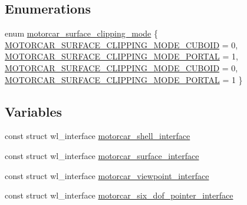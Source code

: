 \subsection*{Enumerations}
\begin{DoxyCompactItemize}
\item 
enum \hyperlink{motorcar-client-protocol_8h_a4609d9d55b9d8b4d07c8dd85fa4ec19d}{motorcar\-\_\-surface\-\_\-clipping\-\_\-mode} \{ \hyperlink{motorcar-client-protocol_8h_a4609d9d55b9d8b4d07c8dd85fa4ec19dadc771a7d9ed6aed47be1b126978a465a}{M\-O\-T\-O\-R\-C\-A\-R\-\_\-\-S\-U\-R\-F\-A\-C\-E\-\_\-\-C\-L\-I\-P\-P\-I\-N\-G\-\_\-\-M\-O\-D\-E\-\_\-\-C\-U\-B\-O\-I\-D} = 0, 
\hyperlink{motorcar-client-protocol_8h_a4609d9d55b9d8b4d07c8dd85fa4ec19da5459ef74d3fb34c194e2a26e3f3d3a40}{M\-O\-T\-O\-R\-C\-A\-R\-\_\-\-S\-U\-R\-F\-A\-C\-E\-\_\-\-C\-L\-I\-P\-P\-I\-N\-G\-\_\-\-M\-O\-D\-E\-\_\-\-P\-O\-R\-T\-A\-L} = 1, 
\hyperlink{motorcar-server-protocol_8h_a4609d9d55b9d8b4d07c8dd85fa4ec19dadc771a7d9ed6aed47be1b126978a465a}{M\-O\-T\-O\-R\-C\-A\-R\-\_\-\-S\-U\-R\-F\-A\-C\-E\-\_\-\-C\-L\-I\-P\-P\-I\-N\-G\-\_\-\-M\-O\-D\-E\-\_\-\-C\-U\-B\-O\-I\-D} = 0, 
\hyperlink{motorcar-server-protocol_8h_a4609d9d55b9d8b4d07c8dd85fa4ec19da5459ef74d3fb34c194e2a26e3f3d3a40}{M\-O\-T\-O\-R\-C\-A\-R\-\_\-\-S\-U\-R\-F\-A\-C\-E\-\_\-\-C\-L\-I\-P\-P\-I\-N\-G\-\_\-\-M\-O\-D\-E\-\_\-\-P\-O\-R\-T\-A\-L} = 1
 \}
\end{DoxyCompactItemize}
\subsection*{Variables}
\begin{DoxyCompactItemize}
\item 
const struct wl\-\_\-interface \hyperlink{motorcar-client-protocol_8h_a4decf5a74ff7a553e7cb41be3a9c580e}{motorcar\-\_\-shell\-\_\-interface}
\item 
const struct wl\-\_\-interface \hyperlink{motorcar-client-protocol_8h_a56acb8594d0103b3705453e8ea77915b}{motorcar\-\_\-surface\-\_\-interface}
\item 
const struct wl\-\_\-interface \hyperlink{motorcar-client-protocol_8h_a90843869d07a9812f0b0eb66ed03ed20}{motorcar\-\_\-viewpoint\-\_\-interface}
\item 
const struct wl\-\_\-interface \hyperlink{motorcar-client-protocol_8h_abbda765471c6cc2c3eb8efb2e5a22cbb}{motorcar\-\_\-six\-\_\-dof\-\_\-pointer\-\_\-interface}
\end{DoxyCompactItemize}


